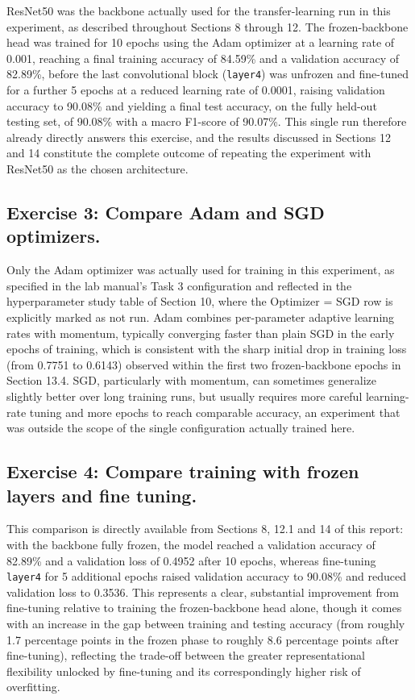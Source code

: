 \documentclass[11pt,a4paper]{article}
\begin{document}
ResNet50 was the backbone actually used for the transfer-learning run in this experiment, as described throughout Sections 8 through 12. The frozen-backbone head was trained for 10 epochs using the Adam optimizer at a learning rate of 0.001, reaching a final training accuracy of 84.59\% and a validation accuracy of 82.89\%, before the last convolutional block (\texttt{layer4}) was unfrozen and fine-tuned for a further 5 epochs at a reduced learning rate of 0.0001, raising validation accuracy to 90.08\% and yielding a final test accuracy, on the fully held-out testing set, of 90.08\% with a macro F1-score of 90.07\%. This single run therefore already directly answers this exercise, and the results discussed in Sections 12 and 14 constitute the complete outcome of repeating the experiment with ResNet50 as the chosen architecture.

\subsection*{Exercise 3: Compare Adam and SGD optimizers.}

Only the Adam optimizer was actually used for training in this experiment, as specified in the lab manual's Task 3 configuration and reflected in the hyperparameter study table of Section 10, where the Optimizer = SGD row is explicitly marked as not run. Adam combines per-parameter adaptive learning rates with momentum, typically converging faster than plain SGD in the early epochs of training, which is consistent with the sharp initial drop in training loss (from 0.7751 to 0.6143) observed within the first two frozen-backbone epochs in Section 13.4. SGD, particularly with momentum, can sometimes generalize slightly better over long training runs, but usually requires more careful learning-rate tuning and more epochs to reach comparable accuracy, an experiment that was outside the scope of the single configuration actually trained here.

\subsection*{Exercise 4: Compare training with frozen layers and fine tuning.}

This comparison is directly available from Sections 8, 12.1 and 14 of this report: with the backbone fully frozen, the model reached a validation accuracy of 82.89\% and a validation loss of 0.4952 after 10 epochs, whereas fine-tuning \texttt{layer4} for 5 additional epochs raised validation accuracy to 90.08\% and reduced validation loss to 0.3536. This represents a clear, substantial improvement from fine-tuning relative to training the frozen-backbone head alone, though it comes with an increase in the gap between training and testing accuracy (from roughly 1.7 percentage points in the frozen phase to roughly 8.6 percentage points after fine-tuning), reflecting the trade-off between the greater representational flexibility unlocked by fine-tuning and its correspondingly higher risk of overfitting.
\end{document}
